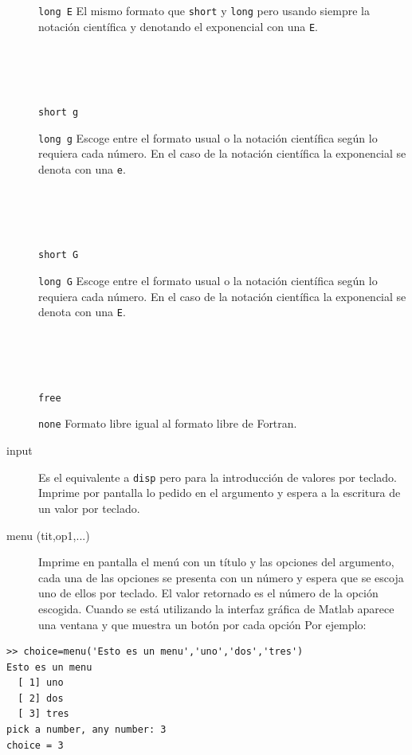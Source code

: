 \begin{description}
\begin{minipage}[c]{0.8\columnwidth}
{\texttt{long E}} El mismo formato que \texttt{short} y \texttt{long}
pero usando siempre la notación científica y denotando el exponencial
con una \texttt{E}.\end{minipage}%
\\
\\
\\
\begin{minipage}[c]{0.8\columnwidth}%
{\texttt{short g}} 

{\texttt{long g}} Escoge entre el formato usual o la notación científica
según lo requiera cada número. En el caso de la notación científica
la exponencial se denota con una \texttt{e}.\end{minipage}%
\\
\\
\\
\begin{minipage}[c]{0.8\columnwidth}%
{\texttt{short G}} 

{\texttt{long G}} Escoge entre el formato usual o la notación
científica según lo requiera cada número. En el caso de la notación
científica la exponencial se denota con una \texttt{E}.\end{minipage}%
\\
\\
\\
\begin{minipage}[c]{0.8\columnwidth}%
\texttt{free} 

\texttt{none} Formato libre igual al formato libre de
Fortran.\end{minipage}%

\item [input\index{input}]Es el equivalente a \texttt{disp} pero para
  la introducción de valores por teclado. Imprime por pantalla lo
  pedido en el argumento y espera a la escritura de un valor por
  teclado.
\item [{menu (tit,op1,...)}]Imprime en pantalla el menú
  con un título y las opciones del argumento, cada una de las opciones
  se presenta con un número y espera que se escoja uno de ellos por
  teclado.  El valor retornado es el número de la opción escogida.
  Cuando se está utilizando la interfaz gráfica de Matlab aparece una
  ventana y que muestra un botón por cada opción Por ejemplo:
\end{description}
  \begin{verbatim}
>> choice=menu('Esto es un menu','uno','dos','tres')
Esto es un menu
  [ 1] uno
  [ 2] dos
  [ 3] tres
pick a number, any number: 3
choice = 3
\end{verbatim}

